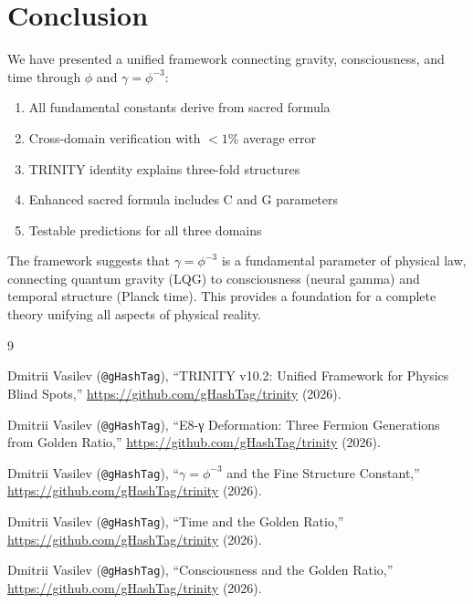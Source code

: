 \documentclass[12pt,a4paper]{article}
\begin{document}
\section{Conclusion}

We have presented a unified framework connecting gravity, consciousness, and time through $\phi$ and $\gamma = \phi^{-3}$:

\begin{enumerate}
\item All fundamental constants derive from sacred formula
\item Cross-domain verification with $< 1\%$ average error
\item TRINITY identity explains three-fold structures
\item Enhanced sacred formula includes C and G parameters
\item Testable predictions for all three domains
\end{enumerate}

The framework suggests that $\gamma = \phi^{-3}$ is a fundamental parameter of physical law, connecting quantum gravity (LQG) to consciousness (neural gamma) and temporal structure (Planck time). This provides a foundation for a complete theory unifying all aspects of physical reality.

\begin{thebibliography}{9}

Dmitrii Vasilev (\texttt{@gHashTag}),
``TRINITY v10.2: Unified Framework for Physics Blind Spots,''
\url{https://github.com/gHashTag/trinity} (2026).

Dmitrii Vasilev (\texttt{@gHashTag}),
``E8-γ Deformation: Three Fermion Generations from Golden Ratio,''
\url{https://github.com/gHashTag/trinity} (2026).

Dmitrii Vasilev (\texttt{@gHashTag}),
``$\gamma = \phi^{-3}$ and the Fine Structure Constant,''
\url{https://github.com/gHashTag/trinity} (2026).

Dmitrii Vasilev (\texttt{@gHashTag}),
``Time and the Golden Ratio,''
\url{https://github.com/gHashTag/trinity} (2026).

Dmitrii Vasilev (\texttt{@gHashTag}),
``Consciousness and the Golden Ratio,''
\url{https://github.com/gHashTag/trinity} (2026).

\end{thebibliography}
\end{document}
